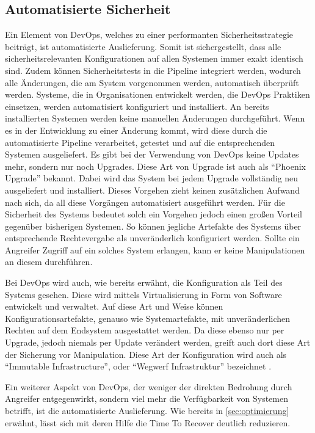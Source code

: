 \subsection{Automatisierte Sicherheit}
Ein Element von DevOps, welches zu einer performanten Sicherheitsstrategie beiträgt, ist automatisierte Auslieferung. 
Somit ist sichergestellt, dass alle sicherheitsrelevanten Konfigurationen auf allen Systemen immer exakt identisch sind. 
Zudem können Sicherheitstests in die Pipeline integriert werden, wodurch alle Änderungen, die am System vorgenommen werden, automatisch überprüft werden.
Systeme, die in Organisationen entwickelt werden, die DevOps Praktiken einsetzen, werden automatisiert konfiguriert und installiert. 
An bereits installierten Systemen werden keine manuellen Änderungen durchgeführt. 
Wenn es in der Entwicklung zu einer Änderung kommt, wird diese durch die automatisierte Pipeline verarbeitet, getestet und auf die entsprechenden Systemen ausgeliefert. 
Es gibt bei der Verwendung von DevOps keine Updates mehr, sondern nur noch Upgrades.
Diese Art von Upgrade ist auch als \enquote{Phoenix Upgrade} bekannt. 
Dabei wird das System bei jedem Upgrade vollständig neu ausgeliefert und installiert. 
Dieses Vorgehen zieht keinen zusätzlichen Aufwand nach sich, da all diese Vorgängen automatisiert ausgeführt werden.
Für die Sicherheit des Systems bedeutet solch ein Vorgehen jedoch einen großen Vorteil gegenüber bisherigen Systemen. 
So können jegliche Artefakte des Systems über entsprechende Rechtevergabe als unveränderlich konfiguriert werden. 
Sollte ein Angreifer Zugriff auf ein solches System erlangen, kann er keine Manipulationen an diesem durchführen. \parencite[Vgl.][S. 22]{fisher-miranda:2014}

Bei DevOps wird auch, wie bereits erwähnt, die Konfiguration als Teil des Systems gesehen. 
Diese wird mittels Virtualisierung in Form von Software entwickelt und verwaltet. 
Auf diese Art und Weise können Konfigurationsartefakte, genauso wie Systemartefakte, mit unveränderlichen Rechten auf dem Endsystem ausgestattet werden. 
Da diese ebenso nur per Upgrade, jedoch niemals per Update verändert werden, greift auch dort diese Art der Sicherung vor Manipulation. 
Diese Art der Konfiguration wird auch als \enquote{Immutable Infrastructure}, oder \enquote{Wegwerf Infrastruktur} bezeichnet \parencite[vgl.][S. 16]{matthias:2015}.

Ein weiterer Aspekt von DevOps, der weniger der direkten Bedrohung durch Angreifer entgegenwirkt, sondern viel mehr die Verfügbarkeit von Systemen betrifft, ist die automatisierte Auslieferung. 
Wie bereits in \autoref{sec:optimierung} erwähnt, lässt sich mit deren Hilfe die Time To Recover deutlich reduzieren. 

